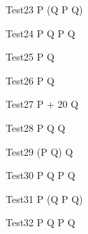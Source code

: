\begin{circus}
   \circprocess Test23 \circdef  P \circseq (Q \circtimeout {} \rcirctime P \circseq Q)\\
\end{circus}

\begin{circus}
   \circprocess Test24 \circdef  P \circtimeout {} \rcirctime Q \circtimeout {} \rcirctime P \circseq Q\\
\end{circus}


\begin{circus}
   \circprocess Test25 \circdef  P \circtimedinterrupt {} \rcirctime Q  \\
\end{circus}

\begin{circus}
   \circprocess Test26 \circdef  P \circtimedinterrupt {}  \rcirctime Q \\
\end{circus}
 
\begin{circus}
   \circprocess Test27 \circdef  P \circtimedinterrupt {} + 20 \rcirctime Q  \\
\end{circus}


\begin{circus}
    \circprocess Test28 \circdef  P \circseq Q \circtimedinterrupt {} \rcirctime Q  \\
\end{circus}
 
\begin{circus}
    \circprocess Test29 \circdef  (P \circseq Q) \circtimedinterrupt {} \rcirctime Q \\
\end{circus}

\begin{circus}
   \circprocess Test30 \circdef  P \circseq Q \circtimedinterrupt {} \rcirctime  P \circseq Q \\
\end{circus}
 
\begin{circus}
    \circprocess Test31 \circdef  P \circseq (Q \circtimedinterrupt {} \rcirctime P \circseq Q)\\
\end{circus}

\begin{circus}
    \circprocess Test32 \circdef  P \circtimedinterrupt {} \rcirctime Q \circtimedinterrupt {} \rcirctime P \circseq Q\\
\end{circus}
